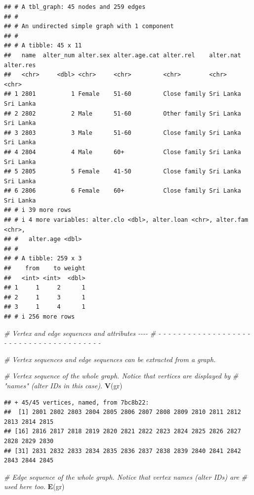\documentclass[
]{book}
\newenvironment{Shaded}{\begin{snugshade}}{\end{snugshade}}
\newcommand{\CommentTok}[1]{\textcolor[rgb]{0.56,0.35,0.01}{\textit{#1}}}
\newcommand{\FunctionTok}[1]{\textcolor[rgb]{0.13,0.29,0.53}{\textbf{#1}}}
\newcommand{\NormalTok}[1]{#1}
\begin{document}
\begin{verbatim}
## # A tbl_graph: 45 nodes and 259 edges
## #
## # An undirected simple graph with 1 component
## #
## # A tibble: 45 x 11
##   name  alter_num alter.sex alter.age.cat alter.rel    alter.nat alter.res
##   <chr>     <dbl> <chr>     <chr>         <chr>        <chr>     <chr>    
## 1 2801          1 Female    51-60         Close family Sri Lanka Sri Lanka
## 2 2802          2 Male      51-60         Other family Sri Lanka Sri Lanka
## 3 2803          3 Male      51-60         Close family Sri Lanka Sri Lanka
## 4 2804          4 Male      60+           Close family Sri Lanka Sri Lanka
## 5 2805          5 Female    41-50         Close family Sri Lanka Sri Lanka
## 6 2806          6 Female    60+           Close family Sri Lanka Sri Lanka
## # i 39 more rows
## # i 4 more variables: alter.clo <dbl>, alter.loan <chr>, alter.fam <chr>,
## #   alter.age <dbl>
## #
## # A tibble: 259 x 3
##    from    to weight
##   <int> <int>  <dbl>
## 1     1     2      1
## 2     1     3      1
## 3     1     4      1
## # i 256 more rows
\end{verbatim}

\begin{Shaded}
\begin{Highlighting}[]
\CommentTok{\# Vertex and edge sequences and attributes                                  {-}{-}{-}{-}}
\CommentTok{\# {-} {-} {-} {-} {-} {-} {-} {-} {-} {-} {-} {-} {-} {-} {-} {-} {-} {-} {-} {-} {-} {-} {-} {-} {-} {-} {-} {-} {-} {-} {-} {-} {-} {-} {-} {-} {-} {-} {-} }

\CommentTok{\# Vertex sequences and edge sequences can be extracted from a graph.}

\CommentTok{\# Vertex sequence of the whole graph. Notice that vertices are displayed by}
\CommentTok{\# "names" (alter IDs in this case).}
\FunctionTok{V}\NormalTok{(gr)}
\end{Highlighting}
\end{Shaded}

\begin{verbatim}
## + 45/45 vertices, named, from 7bc8b22:
##  [1] 2801 2802 2803 2804 2805 2806 2807 2808 2809 2810 2811 2812 2813 2814 2815
## [16] 2816 2817 2818 2819 2820 2821 2822 2823 2824 2825 2826 2827 2828 2829 2830
## [31] 2831 2832 2833 2834 2835 2836 2837 2838 2839 2840 2841 2842 2843 2844 2845
\end{verbatim}

\begin{Shaded}
\begin{Highlighting}[]
\CommentTok{\# Edge sequence of the whole graph. Notice that vertex names (alter IDs) are}
\CommentTok{\# used here too.}
\FunctionTok{E}\NormalTok{(gr)}
\end{Highlighting}
\end{Shaded}
\end{document}
